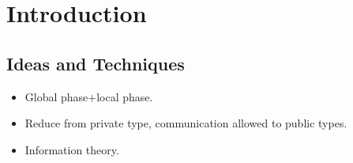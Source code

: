 \section{Introduction}


\subsection{Ideas and Techniques}
\begin{itemize}
\item Global phase+local phase.
\item Reduce from private type, communication allowed to public types.
\item Information theory.
\end{itemize}

